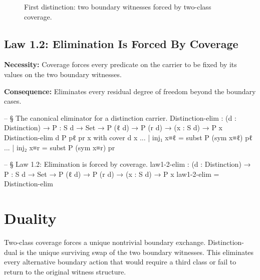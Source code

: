 \documentclass[11pt,a4paper]{book}
\def\texttt#1{#1}%
\begin{document}
\begin{figure}[h]
\centering
{}
\caption{First distinction: two boundary witnesses forced by two-class coverage.}
\label{fig:first-distinction}
\end{figure}

\subsection{Law 1.2: Elimination Is Forced By Coverage}

\textbf{Necessity:} Coverage forces every predicate on the carrier to be fixed by its values on the two boundary witnesses.

\textbf{Consequence:} Eliminates every residual degree of freedom beyond the boundary cases.

\begin{code}
-- § The canonical eliminator for a distinction carrier.
Distinction-elim :
  (d : Distinction) →
  {P : S d → Set} →
  P (ℓ d) →
  P (r d) →
  (x : S d) →
  P x
Distinction-elim d {P} pℓ pr x with cover d x
... | inj₁ x≡ℓ = subst P (sym x≡ℓ) pℓ
... | inj₂ x≡r = subst P (sym x≡r) pr
\end{code}

\begin{code}
-- § Law 1.2: Elimination is forced by coverage.
law1-2-elim :
  (d : Distinction) →
  {P : S d → Set} →
  P (ℓ d) →
  P (r d) →
  (x : S d) →
  P x
law1-2-elim = Distinction-elim
\end{code}

\section{Duality}

Two-class coverage forces a unique nontrivial boundary exchange.
\texttt{Distinction-dual} is the unique surviving swap of the two boundary witnesses.
This eliminates every alternative boundary action that would require a third class or fail to return to the original witness structure.
\end{document}

